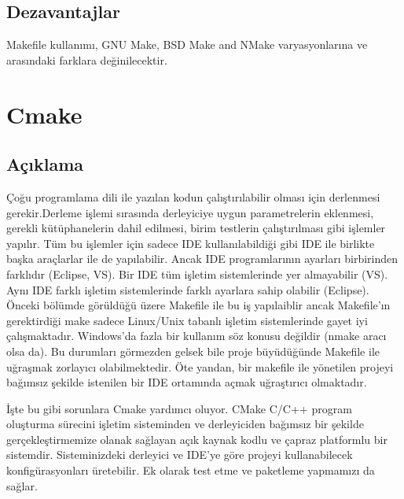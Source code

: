 \documentclass[
]{book}
\begin{document}
\hypertarget{dezavantajlar}{%
\section*{Dezavantajlar}\label{dezavantajlar}}

Makefile kullanımı, GNU Make, BSD Make and NMake varyasyonlarına ve arasındaki farklara değinilecektir.

\hypertarget{cmake}{%
\chapter*{Cmake}\label{cmake}}

\hypertarget{auxe7ux131klama-2}{%
\section*{Açıklama}\label{auxe7ux131klama-2}}

Çoğu programlama dili ile yazılan kodun çalıştırılabilir olması için derlenmesi gerekir.Derleme işlemi sırasında derleyiciye uygun parametrelerin eklenmesi, gerekli kütüphanelerin dahil edilmesi, birim testlerin çalıştırılması gibi işlemler yapılır. Tüm bu işlemler için sadece IDE kullanılabildiği gibi IDE ile birlikte başka araçlarlar ile de yapılabilir. Ancak IDE programlarının ayarları birbirinden farklıdır (Eclipse, VS). Bir IDE tüm işletim sistemlerinde yer almayabilir (VS). Aynı IDE farklı işletim sistemlerinde farklı ayarlara sahip olabilir (Eclipse). Önceki bölümde görüldüğü üzere Makefile ile bu iş yapılaiblir ancak Makefile'ın gerektirdiği make sadece Linux/Unix tabanlı işletim sistemlerinde gayet iyi çalışmaktadır. Windows'da fazla bir kullanım söz konusu değildir (nmake aracı olsa da). Bu durumları görmezden gelsek bile proje büyüdüğünde Makefile ile uğraşmak zorlayıcı olabilmektedir. Öte yandan, bir makefile ile yönetilen projeyi bağımsız şekilde istenilen bir IDE ortamında açmak uğraştırıcı olmaktadır.

İşte bu gibi sorunlara Cmake yardımcı oluyor. CMake C/C++ program oluşturma sürecini işletim sisteminden ve derleyiciden bağımsız bir şekilde gerçekleştirmemize olanak sağlayan açık kaynak kodlu ve çapraz platformlu bir sistemdir. Sisteminizdeki derleyici ve IDE'ye göre projeyi kullanabilecek konfigürasyonları üretebilir. Ek olarak test etme ve paketleme yapmamızı da sağlar.
\end{document}
